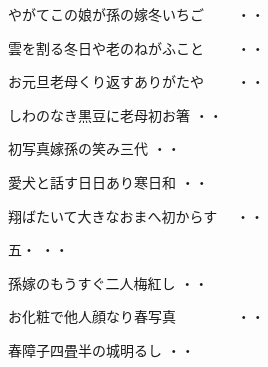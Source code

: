 \vspace{0.4cm}
\begin{shiika}やがてこの娘が孫の嫁冬いちご　　
\hfill{・・}\end{shiika}
\vspace{0.4cm}
\begin{shiika}雲を割る冬日や老のねがふこと　　
\hfill{・・}\end{shiika}
\vspace{0.4cm}
\begin{shiika}お元旦老母くり返すありがたや　　
\hfill{・・}\end{shiika}
\vspace{0.4cm}
\begin{shiika}しわのなき黒豆に老母初お箸
\hfill{・・}\end{shiika}
\vspace{0.4cm}
\begin{shiika}初写真嫁孫の笑み三代
\hfill{・・}\end{shiika}
\vspace{0.4cm}
\begin{shiika}愛犬と話す日日あり寒日和
\hfill{・・}\end{shiika}
\vspace{0.4cm}
\begin{shiika}翔ばたいて大きなおまへ初からす　
\hfill{・・}\end{shiika}
\vspace{0.4cm}
\begin{shiika}五・
\hfill{・・}\end{shiika}
\vspace{0.4cm}
\begin{shiika}孫嫁のもうすぐ二人梅紅し
\hfill{・・}\end{shiika}
\vspace{0.4cm}
\begin{shiika}お化粧で他人顔なり春写真　　　　
\hfill{・・}\end{shiika}
\vspace{0.4cm}
\begin{shiika}春障子四畳半の城明るし
\hfill{・・}\end{shiika}
